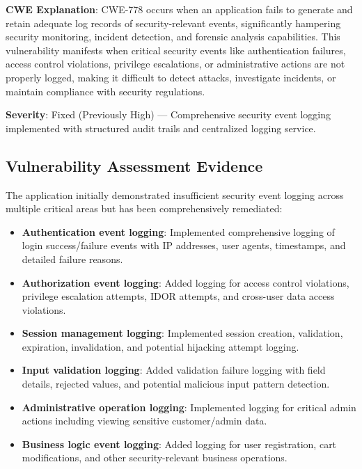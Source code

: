\documentclass[]{UCD_CS_FYP_Report}
\begin{document}
\textbf{CWE Explanation}: CWE-778 occurs when an application fails to generate and retain adequate log records of security-relevant events, significantly hampering security monitoring, incident detection, and forensic analysis capabilities. This vulnerability manifests when critical security events like authentication failures, access control violations, privilege escalations, or administrative actions are not properly logged, making it difficult to detect attacks, investigate incidents, or maintain compliance with security regulations.

\textbf{Severity}: Fixed (Previously High) — Comprehensive security event logging implemented with structured audit trails and centralized logging service.

\subsection{Vulnerability Assessment Evidence}
The application initially demonstrated insufficient security event logging across multiple critical areas but has been comprehensively remediated:
\begin{itemize}
	\item \textbf{Authentication event logging}: Implemented comprehensive logging of login success/failure events with IP addresses, user agents, timestamps, and detailed failure reasons.
	\item \textbf{Authorization event logging}: Added logging for access control violations, privilege escalation attempts, IDOR attempts, and cross-user data access violations.
	\item \textbf{Session management logging}: Implemented session creation, validation, expiration, invalidation, and potential hijacking attempt logging.
	\item \textbf{Input validation logging}: Added validation failure logging with field details, rejected values, and potential malicious input pattern detection.
	\item \textbf{Administrative operation logging}: Implemented logging for critical admin actions including viewing sensitive customer/admin data.
	\item \textbf{Business logic event logging}: Added logging for user registration, cart modifications, and other security-relevant business operations.
\end{itemize}
\end{document}
